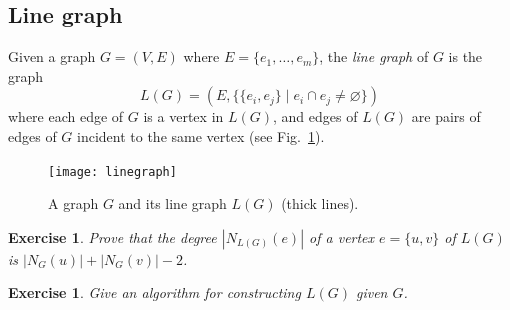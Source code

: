 \documentclass[a4paper]{book}
\theoremstyle{changebreak}                %
\newtheorem{ex}[result]{Exercise}
\begin{document}
\subsection{Line graph}
Given a graph $G=(V,E)$ where $E=\{e_1,\ldots,e_m\}$, the {\it line
  graph} of $G$ is the graph
\begin{equation*}
   L(G) = (E,\{\{e_i,e_j\}\;|\;e_i\cap e_j\not=\varnothing\})
\end{equation*}
where each edge of $G$ is a vertex in $L(G)$, and edges of $L(G)$ are
pairs of edges of $G$ incident to the same vertex (see
Fig.~\ref{f:linegraph}).

\begin{figure}[!ht]
\begin{center}
\texttt{[image: linegraph]}
\end{center}
\caption{A graph $G$ and its line graph $L(G)$ (thick lines).}
\label{f:linegraph}
\end{figure}

\begin{ex}
Prove that the degree $|N_{L(G)}(e)|$ of a vertex $e=\{u,v\}$ of
$L(G)$ is $|N_G(u)|+|N_G(v)|-2$.
\end{ex}

\begin{ex}
Give an algorithm for constructing $L(G)$ given $G$.
\end{ex}
\end{document}

